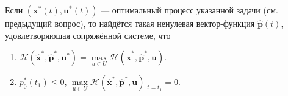 \begin{theorem}
  Если $ (\mathbf{x}^\ast(t), \mathbf{u}^{\ast}(t)) $ --- оптимальный процесс
  указанной задачи (см. предыдущий вопрос), то найдётся такая ненулевая вектор-функция $
  \hat{\mathbf{p}}(t) $, удовлетворяющая сопряжённой системе, что 
  \begin{enumerate}
    \item $ \mathscr H(\hat{\mathbf{x}}^{\ast}, \hat{\mathbf{p}}^{\ast},
      \mathbf{u}^\ast) = \max\limits_{u\in U} \mathscr H(\hat{\mathbf{x}}^\ast,
      \hat{\mathbf{p}}^\ast, \mathbf{u}) $.
    \item $ p_0^\ast(t_1) \leqslant 0 $, $ \max\limits_{u\in U} \mathscr H(\hat{\mathbf{x}}^\ast,
      \hat{\mathbf{p}}^\ast, \mathbf{u})\bigr|_{t=t_1} = 0 $.
  \end{enumerate}
\end{theorem}

